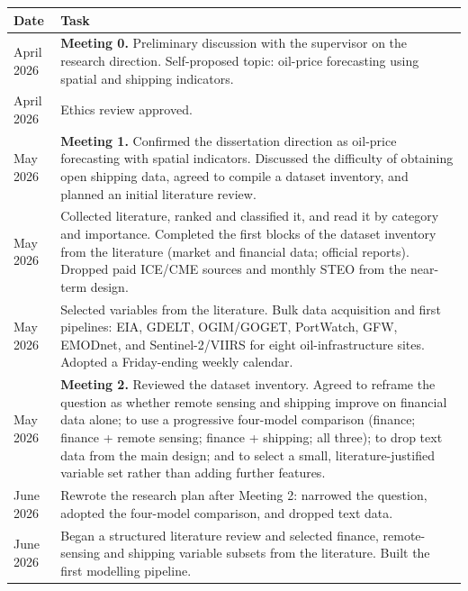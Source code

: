 \documentclass[
  british,
  12pt,
  oneside]{book}
\newcounter{none} %
\begin{document}
{{\def\LTcaptype{none} %
\begin{longtable}[]{@{}
  >{\raggedright\arraybackslash}p{}
  >{\raggedright\arraybackslash}p{}@{}}
\toprule\noalign{}
\begin{minipage}[b]{\linewidth}\raggedright
Date
\end{minipage} & \begin{minipage}[b]{\linewidth}\raggedright
Task
\end{minipage} \\
\midrule\noalign{}
\endhead
\bottomrule\noalign{}
\endlastfoot
10 April 2026 & \textbf{Meeting 0.} Preliminary discussion with the supervisor on the research direction. Self-proposed topic: oil-price forecasting using spatial and shipping indicators. \\
29 April 2026 & Ethics review approved. \\
6 May 2026 & \textbf{Meeting 1.} Confirmed the dissertation direction as oil-price forecasting with spatial indicators. Discussed the difficulty of obtaining open shipping data, agreed to compile a dataset inventory, and planned an initial literature review. \\
22 May 2026 & Collected literature, ranked and classified it, and read it by category and importance. Completed the first blocks of the dataset inventory from the literature (market and financial data; official reports). Dropped paid ICE/CME sources and monthly STEO from the near-term design. \\
25 May 2026 & Selected variables from the literature. Bulk data acquisition and first pipelines: EIA, GDELT, OGIM/GOGET, PortWatch, GFW, EMODnet, and Sentinel-2/VIIRS for eight oil-infrastructure sites. Adopted a Friday-ending weekly calendar. \\
27 May 2026 & \textbf{Meeting 2.} Reviewed the dataset inventory. Agreed to reframe the question as whether remote sensing and shipping improve on financial data alone; to use a progressive four-model comparison (finance; finance + remote sensing; finance + shipping; all three); to drop text data from the main design; and to select a small, literature-justified variable set rather than adding further features. \\
1 June 2026 & Rewrote the research plan after Meeting 2: narrowed the question, adopted the four-model comparison, and dropped text data. \\
5 June 2026 & Began a structured literature review and selected finance, remote-sensing and shipping variable subsets from the literature. Built the first modelling pipeline. \\

\end{longtable}}}
\end{document}
